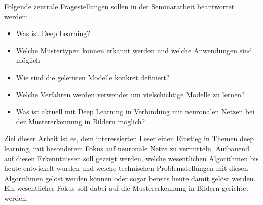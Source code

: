 Folgende zentrale Fragestellungen sollen in der Seminararbeit beantwortet werden:
\begin{itemize}
\item Was ist Deep Learning?
\item Welche Mustertypen können erkannt werden und welche Anwendungen sind möglich
\item Wie sind die gelernten Modelle konkret definiert?
\item Welche Verfahren werden verwendet um vielschichtige Modelle zu lernen?
\item Was ist aktuell mit Deep Learning in Verbindung mit neuronalen Netzen bei der Mustererkennung in Bildern möglich?
\end{itemize}

Ziel dieser Arbeit ist es, dem interessierten Leser einen Einstieg in Themen deep learning, mit besonderem Fokus auf neuronale Netze zu vermitteln. Aufbauend auf diesen Erkenntnissen soll gezeigt werden, welche wesentlichen Algorithmen bis heute entwickelt wurden und welche technischen Problemstellungen mit diesen Algorithmen gelöst werden können oder sogar bereits heute damit gelöst werden. Ein wesentlicher Fokus soll dabei auf die Mustererkennung in Bildern gerichtet werden.



